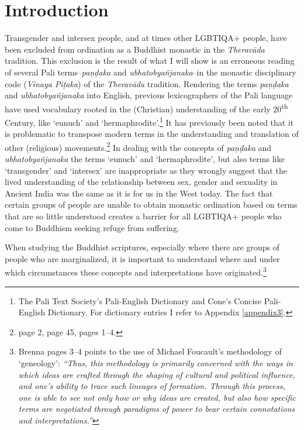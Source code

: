\section{Introduction}
Transgender and intersex people, and at times other LGBTIQA+ people, have been excluded from ordination as a Buddhist monastic in the {\em Theravāda} tradition. This exclusion is the result of what I will show is an erroneous reading of several Pali terms--{\em paṇḍaka} and {\em ubhatob­yañ­janaka}--in the monastic disciplinary code ({\em Vinaya Piṭaka}) of the {\em Theravāda} tradition. Rendering the terms {\em paṇḍaka} and {\em ubhatob­yañ­janaka} into English, previous lexicographers of the Pali language have used vocabulary rooted in the (Christian) understanding of the early 20\textsuperscript{th} Century, like `eunuch' and `hermaphrodite'.\footnote{The Pali Text Society's Pali-English Dictionary and Cone's Concise Pali-English Dictionary. For dictionary entries I refer to Appendix \ref{appendix3}.} It has previously been noted that it is problematic to transpose modern terms in the understanding and translation of other (religious) movements.\footnote{\cite{maes} page 2, \cite{dudas} page 45, \cite{artinger} pages 1–4.} In dealing with the concepts of {\em paṇḍaka} and {\em ubhatob­yañ­janaka} the terms `eunuch' and `hermaphrodite', but also terms like `transgender' and `intersex' are inappropriate as they wrongly suggest that the lived understanding of the relationship between sex, gender and sexuality in Ancient India was the same as it is for us in the West today. The fact that certain groups of people are unable to obtain monastic ordination based on terms that are so little understood creates a barrier for all LGBTIQA+ people who come to Buddhism seeking refuge from suffering.

When studying the Buddhist scriptures, especially where there are groups of people who are marginalized, it is important to understand where and under which circumstances these concepts and interpretations have originated.\footnote{Brenna \cite{artinger} pages 3–4 points to the use of Michael Foucault's methodology of `geneology': {\em ``Thus, this methodology is primarily concerned with the ways in which ideas are crafted through the shaping of cultural and political influence, and one's ability to trace such lineages of formation. Through this process, one is able to see not only how or why ideas are created, but also how specific terms are negotiated through paradigms of power to bear certain connotations and interpretations.''}}

